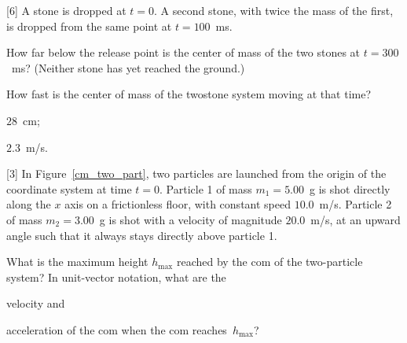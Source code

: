 \begin{problem}
	A stone is dropped at $t = 0$. A second stone, with twice the mass of the first, is dropped from the same point at $t = 100$~ms. 
	\begin{enumerate*}[label=(\alph*)]
		\item How far below the release point is the center of mass of the two stones at $t = 300$~ms? (Neither stone has yet reached the ground.)
		\item How fast is the center of mass of the twostone system moving at that time?
	\end{enumerate*}
	\begin{solution}
		\begin{enumerate*}[label=(\alph*)]
			\item $28$~cm;
			\item $2.3$~m/s.
		\end{enumerate*}
	\end{solution}
\end{problem}

\begin{problem}\label{prb:cm_two_part}
	[3]%
	In Figure~\ref{cm_two_part}, two particles are launched from the origin of the coordinate system at time $t = 0$. Particle 1 of mass $m_1 = 5.00$~g is shot directly along the $x$ axis on a frictionless floor, with constant speed $10.0$~m/s. Particle 2 of mass $m_2 = 3.00$~g is shot with a velocity of magnitude $20.0$~m/s, at an upward angle such that it always stays directly above particle 1. 
	\begin{enumerate*}[label=(\alph*)]
		\item What is the maximum height $h_{\max}$ reached by the com of the two-particle system? 
		In unit-vector notation, what are the
		\item velocity and 
		\item acceleration of the com when the com reaches~$h_{\max}$?
	\end{enumerate*}
\end{problem}

